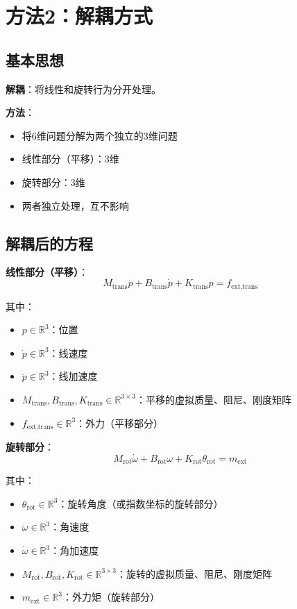 \documentclass[12pt,a4paper]{article}
\begin{document}
\section{方法2：解耦方式}

\subsection{基本思想}

\textbf{解耦}：将线性和旋转行为分开处理。

\textbf{方法}：
\begin{itemize}
\item 将6维问题分解为两个独立的3维问题
\item 线性部分（平移）：3维
\item 旋转部分：3维
\item 两者独立处理，互不影响
\end{itemize}

\subsection{解耦后的方程}

\textbf{线性部分（平移）}：
\begin{equation}
M_{\text{trans}}\ddot{p} + B_{\text{trans}}\dot{p} + K_{\text{trans}}p = f_{\text{ext,trans}} \tag{11.64-trans}
\end{equation}

其中：
\begin{itemize}
\item $p \in \mathbb{R}^3$：位置
\item $\dot{p} \in \mathbb{R}^3$：线速度
\item $\ddot{p} \in \mathbb{R}^3$：线加速度
\item $M_{\text{trans}}, B_{\text{trans}}, K_{\text{trans}} \in \mathbb{R}^{3 \times 3}$：平移的虚拟质量、阻尼、刚度矩阵
\item $f_{\text{ext,trans}} \in \mathbb{R}^3$：外力（平移部分）
\end{itemize}

\textbf{旋转部分}：
\begin{equation}
M_{\text{rot}}\dot{\omega} + B_{\text{rot}}\omega + K_{\text{rot}}\theta_{\text{rot}} = m_{\text{ext}} \tag{11.64-rot}
\end{equation}

其中：
\begin{itemize}
\item $\theta_{\text{rot}} \in \mathbb{R}^3$：旋转角度（或指数坐标的旋转部分）
\item $\omega \in \mathbb{R}^3$：角速度
\item $\dot{\omega} \in \mathbb{R}^3$：角加速度
\item $M_{\text{rot}}, B_{\text{rot}}, K_{\text{rot}} \in \mathbb{R}^{3 \times 3}$：旋转的虚拟质量、阻尼、刚度矩阵
\item $m_{\text{ext}} \in \mathbb{R}^3$：外力矩（旋转部分）
\end{itemize}
\end{document}
